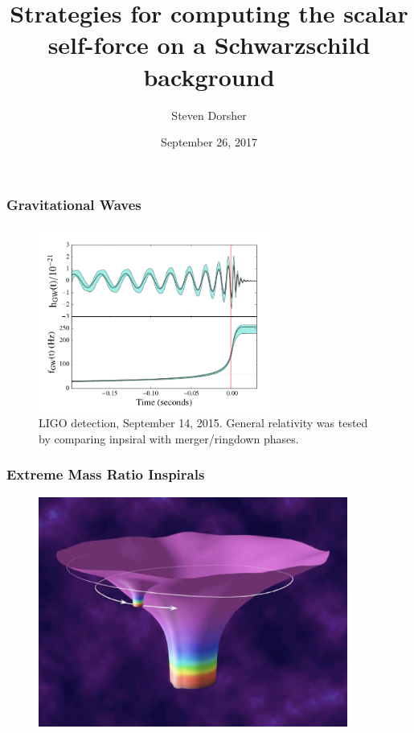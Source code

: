 \documentclass{beamer}
\title{Strategies for computing the scalar self-force on a Schwarzschild background}
\author{Steven Dorsher}
\institute{Louisiana State University}
\date{September 26, 2017}
\begin{document}
\frame{\titlepage}




\begin{frame}
  \frametitle{Gravitational Waves}
  \begin{figure}
    \includegraphics[width=3.0in]{LIGOGRtest.png}
    \caption{LIGO detection, September 14, 2015. General relativity was tested by comparing inpsiral with merger/ringdown phases.}
  \end{figure}
\end{frame}


\begin{frame}
  \frametitle{Extreme Mass Ratio Inspirals}
  \begin{figure}
    \includegraphics[width=4.0in]{EMRI}
  \end{figure}
\end{frame}
\end{document}
